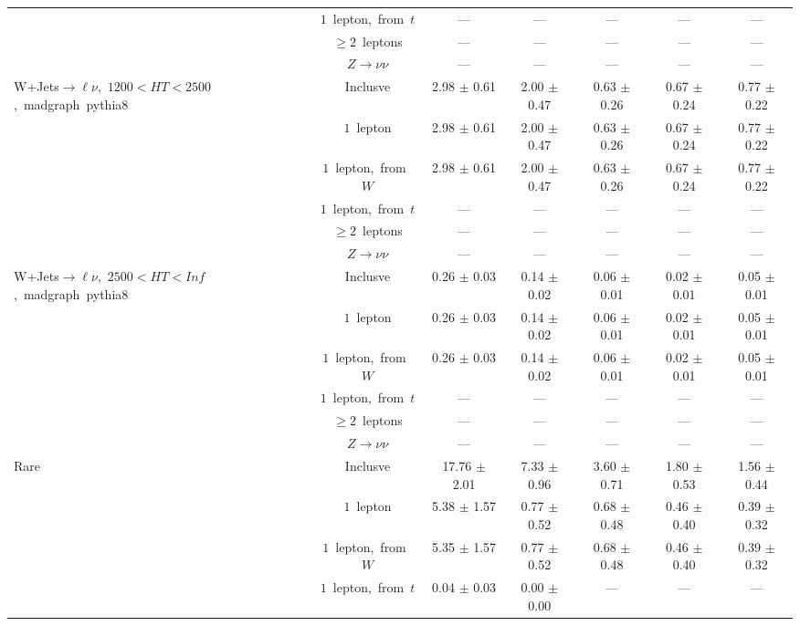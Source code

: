 \documentclass{article}
\begin{document}
\begin{longtable}{|l|c|c|c|c|c|c|}
 & $1$~lepton,~from~$t$  & ---  & ---  & ---  & ---  & --- \\* 
 & $\ge2$~leptons  & ---  & ---  & ---  & ---  & --- \\* 
 & $Z\rightarrow\nu\nu$  & ---  & ---  & ---  & ---  & --- \\* 
\hline 
\multirow{6}{*}{W+Jets$\rightarrow\ell\nu$,~$1200<HT<2500$,~madgraph~pythia8} & Inclusve  & 2.98 $\pm$ 0.61  & 2.00 $\pm$ 0.47  & 0.63 $\pm$ 0.26  & 0.67 $\pm$ 0.24  & 0.77 $\pm$ 0.22 \\* 
 & $1$~lepton  & 2.98 $\pm$ 0.61  & 2.00 $\pm$ 0.47  & 0.63 $\pm$ 0.26  & 0.67 $\pm$ 0.24  & 0.77 $\pm$ 0.22 \\* 
 & $1$~lepton,~from~$W$  & 2.98 $\pm$ 0.61  & 2.00 $\pm$ 0.47  & 0.63 $\pm$ 0.26  & 0.67 $\pm$ 0.24  & 0.77 $\pm$ 0.22 \\* 
 & $1$~lepton,~from~$t$  & ---  & ---  & ---  & ---  & --- \\* 
 & $\ge2$~leptons  & ---  & ---  & ---  & ---  & --- \\* 
 & $Z\rightarrow\nu\nu$  & ---  & ---  & ---  & ---  & --- \\* 
\hline 
\multirow{6}{*}{W+Jets$\rightarrow\ell\nu$,~$2500<HT<Inf$,~madgraph~pythia8} & Inclusve  & 0.26 $\pm$ 0.03  & 0.14 $\pm$ 0.02  & 0.06 $\pm$ 0.01  & 0.02 $\pm$ 0.01  & 0.05 $\pm$ 0.01 \\* 
 & $1$~lepton  & 0.26 $\pm$ 0.03  & 0.14 $\pm$ 0.02  & 0.06 $\pm$ 0.01  & 0.02 $\pm$ 0.01  & 0.05 $\pm$ 0.01 \\* 
 & $1$~lepton,~from~$W$  & 0.26 $\pm$ 0.03  & 0.14 $\pm$ 0.02  & 0.06 $\pm$ 0.01  & 0.02 $\pm$ 0.01  & 0.05 $\pm$ 0.01 \\* 
 & $1$~lepton,~from~$t$  & ---  & ---  & ---  & ---  & --- \\* 
 & $\ge2$~leptons  & ---  & ---  & ---  & ---  & --- \\* 
 & $Z\rightarrow\nu\nu$  & ---  & ---  & ---  & ---  & --- \\* 
\hline 
\multirow{6}{*}{Rare} & Inclusve  & 17.76 $\pm$ 2.01  & 7.33 $\pm$ 0.96  & 3.60 $\pm$ 0.71  & 1.80 $\pm$ 0.53  & 1.56 $\pm$ 0.44 \\* 
 & $1$~lepton  & 5.38 $\pm$ 1.57  & 0.77 $\pm$ 0.52  & 0.68 $\pm$ 0.48  & 0.46 $\pm$ 0.40  & 0.39 $\pm$ 0.32 \\* 
 & $1$~lepton,~from~$W$  & 5.35 $\pm$ 1.57  & 0.77 $\pm$ 0.52  & 0.68 $\pm$ 0.48  & 0.46 $\pm$ 0.40  & 0.39 $\pm$ 0.32 \\* 
 & $1$~lepton,~from~$t$  & 0.04 $\pm$ 0.03  & 0.00 $\pm$ 0.00  & ---  & ---  & --- \\* 

\end{longtable}
\end{document}
